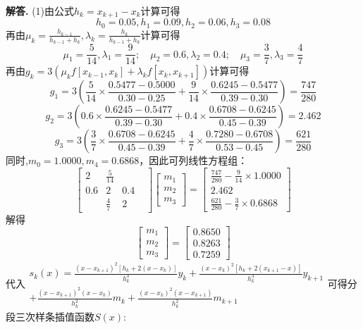 \documentclass[12pt, a4paper, oneside]{ctexart}
\newenvironment{solution}{\par\noindent\textbf{解答. }}{\par}
\begin{document}
\begin{solution}
(1)由公式$h_k=x_{k+1}-x_k$计算可得
\[
    h_0=0.05,h_1=0.09,h_2=0.06,h_3=0.08
\]
再由$\mu_k=\frac{h_{k-1}}{h_{k-1}+h_k},\lambda_k=\frac{h_k}{h_{k-1}+h_k}$计算可得
\[  
    \mu_1=\frac{5}{14},\lambda_1=\frac{9}{14};\quad \mu_2=0.6,\lambda_2=0.4;\quad \mu_3=\frac{3}{7},\lambda_3=\frac{4}{7}
\]
再由$g_k=3(\mu_kf[x_{k-1},x_k]+\lambda_kf[x_k,x_{k+1}])$计算可得
\[
    g_1=3\left(\frac{5}{14}\times\frac{0.5477-0.5000}{0.30-0.25}+\frac{9}{14}\times\frac{0.6245-0.5477}{0.39-0.30}\right)=\frac{747}{280}
\]
\[
    g_2=3\left(0.6\times\frac{0.6245-0.5477}{0.39-0.30}+0.4\times\frac{0.6708-0.6245}{0.45-0.39}\right)=2.462
\]
\[
    g_3=3\left(\frac{3}{7}\times\frac{0.6708-0.6245}{0.45-0.39}+\frac{4}{7}\times\frac{0.7280-0.6708}{0.53-0.45}\right)=\frac{621}{280}
\]
同时,$m_0=1.0000,m_4=0.6868$，因此可列线性方程组：
\[
\begin{bmatrix}2&\frac{5}{14}&&\\0.6&2&0.4&\\&\frac{4}{7}&2&\end{bmatrix}\begin{bmatrix}m_1\\m_2\\m_3\end{bmatrix}=\begin{bmatrix}\frac{747}{280}-\frac{9}{14}\times 1.0000\\2.462\\\frac{621}{280}-\frac{3}{7}\times0.6868\end{bmatrix}
\]
解得
\[
\begin{bmatrix}m_1\\m_2\\m_3\end{bmatrix}=\begin{bmatrix}0.8650\\0.8263\\0.7259\end{bmatrix}
\]
代入$\begin{gathered}s_k(x)=\frac{(x-x_{k+1})^2[h_k+2(x-x_k)]}{h_k^3}y_k+\frac{(x-x_k)^2[h_k+2(x_{k+1}-x)]}{h_k^3}y_{k+1}\\+\frac{(x-x_{k+1})^2(x-x_k)}{h_k^2}m_k+\frac{(x-x_k)^2(x-x_{k+1})}{h_k^2}m_{k+1}\end{gathered}$可得分段三次样条插值函数$S(x)$:
\end{solution}
\end{document}
